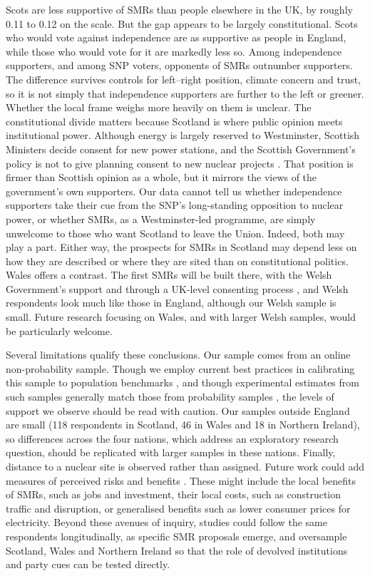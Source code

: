 \documentclass[a4paper, 11pt]{article}
\begin{document}
Scots are less supportive of SMRs than people elsewhere in the UK, by roughly 0.11 to 0.12 on the scale. But the gap appears to be largely constitutional. Scots who would vote against independence are as supportive as people in England, while those who would vote for it are markedly less so. Among independence supporters, and among SNP voters, opponents of SMRs outnumber supporters. The difference survives controls for left--right position, climate concern and trust, so it is not simply that independence supporters are further to the left or greener. Whether the local frame weighs more heavily on them is unclear. The constitutional divide matters because Scotland is where public opinion meets institutional power. Although energy is largely reserved to Westminster, Scottish Ministers decide consent for new power stations, and the Scottish Government's policy is not to give planning consent to new nuclear projects \citep{scotgov2023,desnz2026anf}. That position is firmer than Scottish opinion as a whole, but it mirrors the views of the government's own supporters. Our data cannot tell us whether independence supporters take their cue from the SNP's long-standing opposition to nuclear power, or whether SMRs, as a Westminster-led programme, are simply unwelcome to those who want Scotland to leave the Union. Indeed, both may play a part. Either way, the prospects for SMRs in Scotland may depend less on how they are described or where they are sited than on constitutional politics. Wales offers a contrast. The first SMRs will be built there, with the Welsh Government's support and through a UK-level consenting process \citep{sutton2025}, and Welsh respondents look much like those in England, although our Welsh sample is small. Future research focusing on Wales, and with larger Welsh samples, would be particularly welcome.

Several limitations qualify these conclusions. Our sample comes from an online non-probability sample. Though we employ current best practices in calibrating this sample to population benchmarks \citep{elliott2009,elliott_valliant2017,lee2009}, and though experimental estimates from such samples generally match those from probability samples \citep{coppock2018,mullinix2015}, the levels of support we observe should be read with caution. Our samples outside England are small (118 respondents in Scotland, 46 in Wales and 18 in Northern Ireland), so differences across the four nations, which address an exploratory research question, should be replicated with larger samples in these nations. Finally, distance to a nuclear site is observed rather than assigned. Future work could add measures of perceived risks and benefits \citep{slovic2000}. These might include the local benefits of SMRs, such as jobs and investment, their local costs, such as construction traffic and disruption, or generalised benefits such as lower consumer prices for electricity. Beyond these avenues of inquiry, studies could follow the same respondents longitudinally, as specific SMR proposals emerge, and oversample Scotland, Wales and Northern Ireland so that the role of devolved institutions and party cues can be tested directly.
\end{document}

